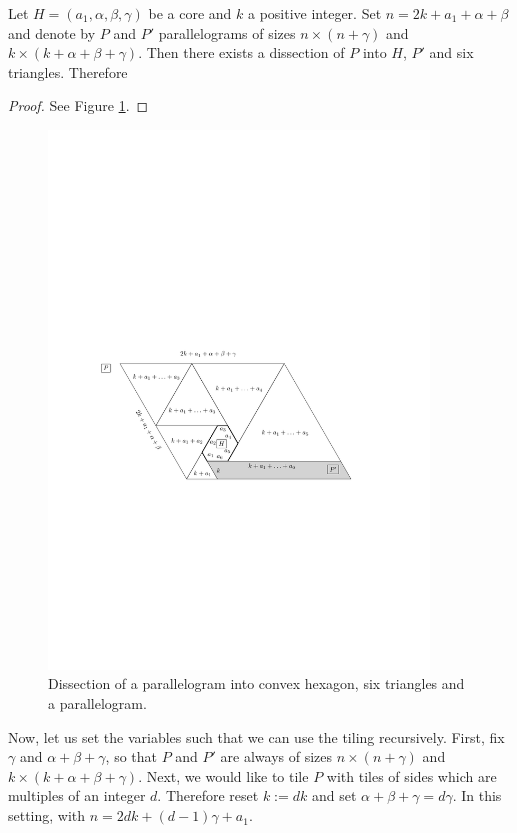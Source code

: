 \begin{lem}
\label{lem:core-tiling}
Let $H = (a_1, \alpha, \beta, \gamma)$ be a core and $k$ a positive integer. Set $n = 2k+a_1+\alpha+\beta$ and denote by $P$ and $P'$ parallelograms of sizes $n\times(n+\gamma)$ and $k\times(k+\alpha+\beta+\gamma)$. Then there exists a dissection of $P$ into $H$, $P'$ and six triangles. Therefore
\end{lem}
\begin{proof}
See Figure \ref{fig:core-tiling1}.
\end{proof}

\begin{figure}[htb]
\centering
\includegraphics[width=0.9\textwidth]{img/core_tiling1.pdf}
\caption{Dissection of a parallelogram into convex hexagon, six triangles and a parallelogram.}
\label{fig:core-tiling1}
\end{figure}

Now, let us set the variables such that we can use the tiling recursively. First, fix $\gamma$ and $\alpha+\beta+\gamma$, so that $P$ and $P'$ are always of sizes $n \times (n+\gamma)$ and $k \times (k+\alpha+\beta+\gamma)$. Next, we would like to tile $P$ with tiles of sides which are multiples of an integer $d$. Therefore reset $k := dk$ and set $\alpha+\beta+\gamma = d\gamma$. In this setting,
with $n = 2dk + (d-1)\gamma + a_1$.

